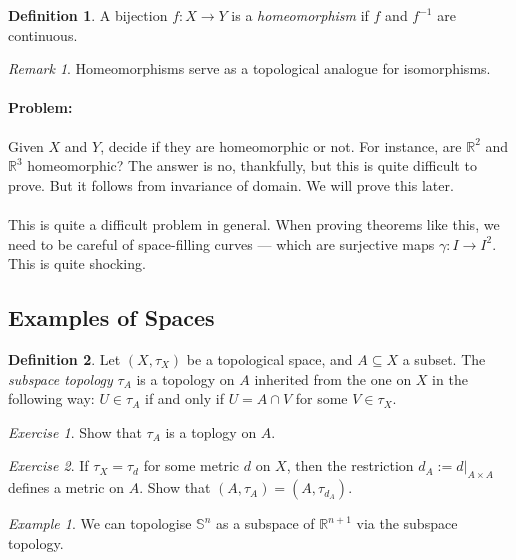 \documentclass[a4paper]{report}
\theoremstyle{definition}
\newtheorem{definition}{Definition}
\theoremstyle{remark}
\newtheorem{remark}{Remark}
\theoremstyle{proposition}
\theoremstyle{conjecture}
\theoremstyle{lemma}
\theoremstyle{corollary}
\theoremstyle{exercise}
\newtheorem{exercise}{Exercise}
\newtheorem{example}{Example}
\begin{document}
\begin{definition}
    A bijection $f : X \to Y$ is a \emph{homeomorphism} if $f$ and $f^{-1}$ 
    are continuous.
\end{definition}

\begin{remark}
    Homeomorphisms serve as a topological analogue for isomorphisms.
\end{remark}

\paragraph{Problem:} Given $X$ and $Y$, decide if they are homeomorphic or not. For instance, are $\mathbb{R}^2$ and $\mathbb{R}^3$ homeomorphic? The answer
is no, thankfully, but this is quite difficult to prove. But it follows from invariance of domain. We will prove this later.\\\\
This is quite a difficult problem in general. When proving theorems like this, 
we need to be careful of space-filling curves --- which are 
surjective maps $\gamma : I \to I^2$. This is quite shocking.

\subsection{Examples of Spaces}

\begin{definition}
    Let $(X, \tau_X)$ be a topological space, and $A\subseteq X$ a subset. 
    The \emph{subspace topology} $\tau_A$  is a topology on $A$ inherited from 
    the one on $X$ in the following way:
    $U \in \tau_A$ if and only if $U = A \cap V$ for some $V \in \tau_X$.
\end{definition}

\begin{exercise}
    Show that $\tau_A$ is a toplogy on $A$.
\end{exercise}

\begin{exercise}
    If $\tau_X = \tau_d$ for some metric $d$ on $X$, then the restriction
    $d_A := d\vert_{A\times A}$ defines a metric on $A$.
    Show that $(A,\tau_A) = (A,\tau_{d_A})$.
\end{exercise}

\begin{example}
    We can topologise $\mathbb{S}^n$ as a subspace of $\mathbb{R}^{n+1}$
    via the subspace topology.
\end{example}
\end{document}
